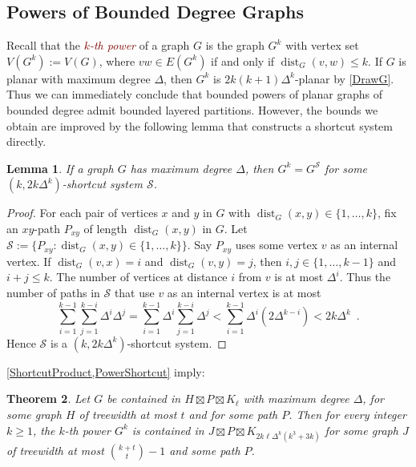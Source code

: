 \documentclass{patmorin}
\theoremstyle{plain}
\newtheorem{thm}{Theorem}
\newtheorem{lem}[thm]{Lemma}
\theoremstyle{definition}
\newcommand{\defin}[1]{\textcolor{Maroon}{\emph{#1}}}
\newcommand{\note}[2]{\noindent{\color{red}[#1:~#2]}}
\DeclareMathOperator{\dist}{dist}
\renewcommand{\SS}{\mathcal{S}}
\renewcommand{\le}{\leqslant}
\renewcommand{\geq}{\geqslant}
\renewcommand{\leq}{\leqslant}
\begin{document}


\subsection{Powers of Bounded Degree Graphs}
\label{Powers}
\label{mid_example}

Recall that the \defin{$k$-th power} of a graph $G$ is the graph $G^k$ with vertex set $V(G^k):=V(G)$, where $vw\in E(G^k)$ if and only if $\dist_G(v,w)\leq k$. If $G$ is planar with maximum degree $\Delta$, then $G^k$ is $2k(k+1)\Delta^{k}$-planar by \cref{DrawG}. Thus we can immediately conclude that bounded powers of planar graphs of bounded degree admit bounded layered partitions. However, the bounds we obtain are improved by the following lemma that constructs a shortcut system directly.

\begin{lem}
\label{PowerShortcut}
If a graph $G$ has maximum degree $\Delta$, then $G^k = G^\SS$ for some $(k,2k \Delta^{k})$-shortcut system $\SS$.
\end{lem}

\begin{proof}
For each pair of vertices $x$ and $y$ in $G$ with $\dist_G(x,y)\in\{1,\dots,k\}$, fix an $xy$-path $P_{xy}$ of length
$\dist_G(x,y)$  in $G$. Let $\SS:=\{P_{xy}: \dist_G(x,y)\in\{1,\dots,k\} \}$. Say $P_{xy}$ uses some vertex $v$ as an internal vertex. If $\dist_G(v,x)=i$ and $\dist_G(v,y)=j$, then $i,j\in\{1,\dots,k-1\}$ and $i+j\leq k$. The number of vertices at distance $i$ from $v$ is at most $\Delta^i$. Thus the number of paths in $\SS$ that use $v$ as an internal vertex is at most
\[\sum_{i=1}^{k-1} \sum_{j=1}^{k-i} \Delta^i\Delta^j
= \sum_{i=1}^{k-1} \Delta^i \sum_{j=1}^{k-i} \Delta^j
< \sum_{i=1}^{k-1} \Delta^i ( 2 \Delta^{k-i} )
< 2k \Delta^k\enspace.\]
Hence $\SS$ is a $(k, 2k \Delta^k)$-shortcut system.
\end{proof}

\cref{ShortcutProduct,PowerShortcut} imply:

\begin{thm}
\label{PowerProduct}
Let $G$ be contained in $H\boxtimes P\boxtimes K_\ell$ with maximum degree $\Delta$, for some graph $H$ of treewidth at most $t$ and for some path $P$. Then for every integer $k\geq 1$, the $k$-th power $G^k$ is contained in $J\boxtimes P\boxtimes K_{2k \ell \Delta^{k}(k^3+3k)}$ for some graph $J$ of treewidth at most $\binom{k+t}{t}-1$ and some path $P$.
\end{thm}
\end{document}
